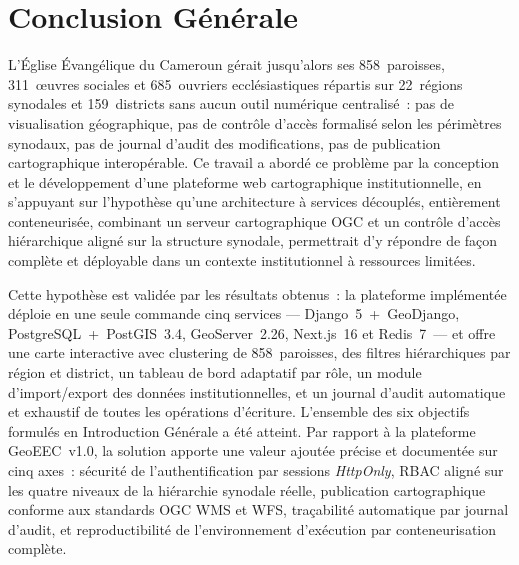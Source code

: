 \documentclass[12pt, a4paper]{report}
\begin{document}
\clearpage

\chapter*{Conclusion Générale}

\noindent
L'Église Évangélique du Cameroun gérait jusqu'alors ses 858~paroisses,
311~œuvres sociales et 685~ouvriers ecclésiastiques répartis sur
22~régions synodales et 159~districts sans aucun outil numérique
centralisé~: pas de visualisation géographique, pas de contrôle d'accès
formalisé selon les périmètres synodaux, pas de journal d'audit des
modifications, pas de publication cartographique interopérable. Ce travail
a abordé ce problème par la conception et le développement d'une
plateforme web cartographique institutionnelle, en s'appuyant sur
l'hypothèse qu'une architecture à services découplés, entièrement
conteneurisée, combinant un serveur cartographique OGC et un contrôle
d'accès hiérarchique aligné sur la structure synodale, permettrait d'y
répondre de façon complète et déployable dans un contexte institutionnel
à ressources limitées.

Cette hypothèse est validée par les résultats obtenus~: la plateforme
implémentée déploie en une seule commande cinq services
--- Django~5~+~GeoDjango, PostgreSQL~+~PostGIS~3.4, GeoServer~2.26,
Next.js~16 et Redis~7~--- et offre une carte interactive avec clustering
de 858~paroisses, des filtres hiérarchiques par région et district, un
tableau de bord adaptatif par rôle, un module d'import/export des données
institutionnelles, et un journal d'audit automatique et exhaustif de toutes
les opérations d'écriture. L'ensemble des six objectifs formulés en
Introduction Générale a été atteint. Par rapport à la plateforme
GeoEEC~v1.0, la solution apporte une valeur ajoutée précise et documentée
sur cinq axes~: sécurité de l'authentification par sessions \textit{HttpOnly},
RBAC aligné sur les quatre niveaux de la hiérarchie synodale réelle,
publication cartographique conforme aux standards OGC WMS et WFS, traçabilité
automatique par journal d'audit, et reproductibilité de l'environnement
d'exécution par conteneurisation complète.
\end{document}
